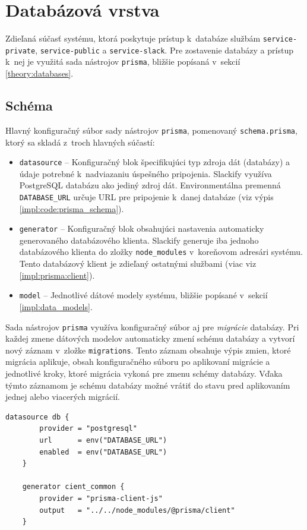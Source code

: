 \section{Databázová vrstva}
\label{impl:database}
Zdieľaná súčasť systému, ktorá poskytuje prístup k~databáze službám \texttt{service-private}, \texttt{service-public} a \texttt{service-slack}. Pre zostavenie databázy a prístup k~nej je využitá sada nástrojov \texttt{prisma}, bližšie popísaná v~sekcií \ref{theory:databases}.

\subsection{Schéma}
Hlavný konfiguračný súbor sady nástrojov \texttt{prisma}, pomenovaný \texttt{schema.prisma}, ktorý sa skladá z~troch hlavných súčastí:

\begin{itemize}
	\item \texttt{datasource} -- Konfiguračný blok špecifikujúci typ zdroja dát (databázy) a údaje potrebné k~nadviazaniu úspešného pripojenia. Slackify využíva PostgreSQL databázu ako jediný zdroj dát. Environmentálna premenná \texttt{DATABASE\_URL} určuje URL pre pripojenie k~danej databáze (viz výpis \ref{impl:code:prisma_schema}).
	\item \texttt{generator} -- Konfiguračný blok obsahujúci nastavenia automaticky generovaného databázového klienta. Slackify generuje iba jednoho databázového klienta do zložky \texttt{node\_modules} v~koreňovom adresári systému. Tento databázový klient je zdieľaný ostatnými službami (viac viz \ref{impl:prisma:client}).
	\item \texttt{model} -- Jednotlivé dátové modely systému, bližšie popísané v~sekcií \ref{impl:data_models}.
\end{itemize}

\noindent Sada nástrojov \texttt{prisma} využíva konfiguračný súbor aj pre \emph{migrácie} databázy. Pri každej zmene dátových modelov automaticky zmení schému databázy a vytvorí nový záznam v~zložke \texttt{migrations}. Tento záznam obsahuje výpis zmien, ktoré migrácia aplikuje, obsah konfiguračného súboru po aplikovaní migrácie a jednotlivé kroky, ktoré migrácia vykoná pre zmenu schémy databázy. Vďaka týmto záznamom je schému databázy možné vrátiť do stavu pred aplikovaním jednej alebo viacerých migrácií.

\begin{lstlisting}[language={Prisma}, label={impl:code:prisma_schema}, caption=Špecifikácia \texttt{datasource} a \texttt{generator} v~konfiguračnom súbore \texttt{prisma}.]
	datasource db {
		provider = "postgresql"
		url      = env("DATABASE_URL")
		enabled  = env("DATABASE_URL")
	}

	generator cient_common {
		provider = "prisma-client-js"
		output   = "../../node_modules/@prisma/client"
	}
\end{lstlisting}


